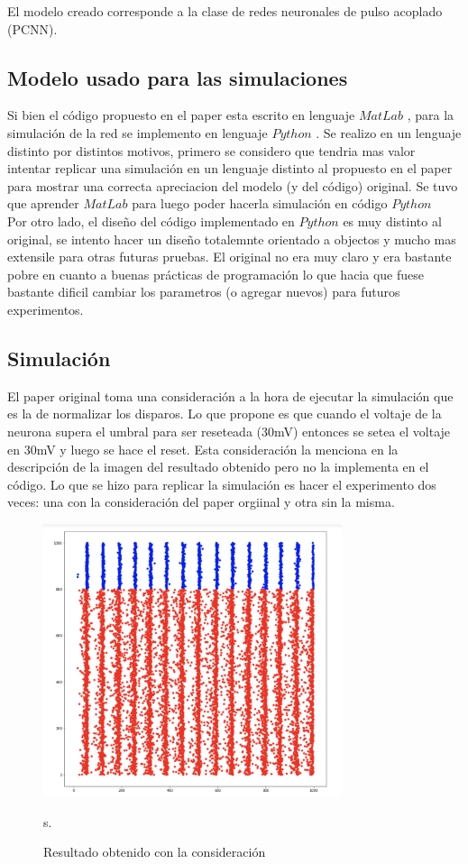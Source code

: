\documentclass[12pt]{article}
\begin{document}
El modelo creado corresponde a la clase de redes neuronales de pulso acoplado (PCNN).
\newpage
\subsection{Modelo usado para las simulaciones}
Si bien el código propuesto en el paper esta escrito en lenguaje $MatLab$ \cite{MatLab}, para la simulación de la red se implemento en lenguaje $Python$ \cite{Python}.
Se realizo en un lenguaje distinto por distintos motivos, primero se considero que tendria mas valor intentar replicar una simulación en un lenguaje distinto al propuesto en el paper
para mostrar una correcta apreciacion del modelo (y del código) original. Se tuvo que aprender $MatLab$ para luego poder hacerla simulación en código $Python$ \\
Por otro lado, el diseño del código implementado en $Python$ es muy distinto al original, se intento hacer un diseño totalemnte orientado a objectos y mucho mas extensile para otras futuras pruebas.
El original no era muy claro y era bastante pobre en cuanto a buenas prácticas de programación lo que hacia que fuese bastante dificil cambiar los parametros (o agregar nuevos) para futuros experimentos.

\subsection{Simulación}
El paper original toma una consideración a la hora de ejecutar la simulación que es la de normalizar los disparos. Lo que propone es que cuando el voltaje de la neurona supera el umbral para ser reseteada (30mV)
entonces se setea el voltaje en 30mV y luego se hace el reset. Esta consideración la menciona en la descripción de la imagen del resultado obtenido pero no la implementa en el código.
Lo que se hizo para replicar la simulación es hacer el experimento dos veces: una con la consideración del paper orgiinal y otra sin la misma.

\begin{figure}[h!]
    \centering
        \includegraphics[height=8cm]{images/resultadoConNorm.png}
    \caption[fontsize=2pt]{Resultado obtenido con la consideración}s.
\end{figure}
\end{document}
